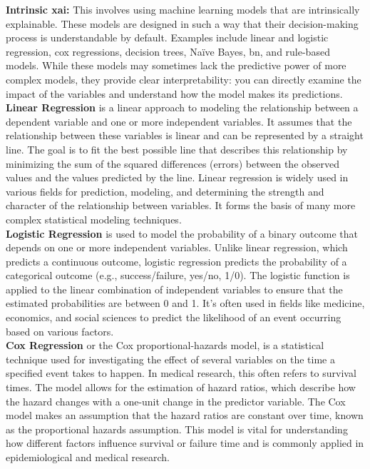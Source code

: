 \textbf{Intrinsic \ac{xai}:} This involves using machine learning models that are intrinsically explainable. These models are designed in such a way that their decision-making process is understandable by default. Examples include linear and logistic regression, cox regressions, decision trees, Naïve Bayes, \ac{bn}, and rule-based models. While these models may sometimes lack the predictive power of more complex models, they provide clear interpretability: you can directly examine the impact of the variables and understand how the model makes its predictions.
\\
\textbf{Linear Regression} is a linear approach to modeling the relationship between a dependent variable and one or more independent variables. It assumes that the relationship between these variables is linear and can be represented by a straight line. The goal is to fit the best possible line that describes this relationship by minimizing the sum of the squared differences (errors) between the observed values and the values predicted by the line. Linear regression is widely used in various fields for prediction, modeling, and determining the strength and character of the relationship between variables. It forms the basis of many more complex statistical modeling techniques.
\\
\textbf{Logistic Regression} is used to model the probability of a binary outcome that depends on one or more independent variables. Unlike linear regression, which predicts a continuous outcome, logistic regression predicts the probability of a categorical outcome (e.g., success/failure, yes/no, 1/0). The logistic function is applied to the linear combination of independent variables to ensure that the estimated probabilities are between 0 and 1. It's often used in fields like medicine, economics, and social sciences to predict the likelihood of an event occurring based on various factors.
\\
\textbf{Cox Regression} or the Cox proportional-hazards model, is a statistical technique used for investigating the effect of several variables on the time a specified event takes to happen. In medical research, this often refers to survival times. The model allows for the estimation of hazard ratios, which describe how the hazard changes with a one-unit change in the predictor variable. The Cox model makes an assumption that the hazard ratios are constant over time, known as the proportional hazards assumption. This model is vital for understanding how different factors influence survival or failure time and is commonly applied in epidemiological and medical research.

